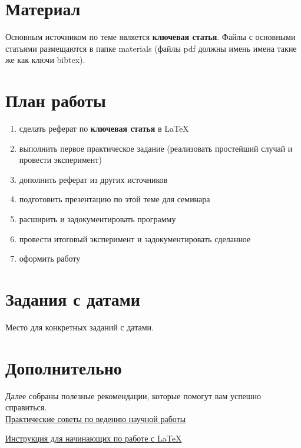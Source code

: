 \documentclass[a4paper,12pt]{article}
\begin{document}
\section{Материал}

Основным источником по теме является \textbf{ключевая статья}. Файлы с основными статьями размещаются в папке materials (файлы pdf должны имень имена такие же как ключи bibtex).


\section{План работы}

\begin{enumerate}
	\item сделать реферат по \textbf{ключевая статья} в LaTeX
	\item выполнить первое практическое задание (реализовать простейший случай и провести эксперимент)
	\item дополнить реферат из других источников
	\item подготовить презентацию по этой теме для семинара
	\item расширить и задокументировать программу
	\item провести итоговый эксперимент и задокументировать сделанное
	\item оформить работу
\end{enumerate}


\section{Задания с датами}

Место для конкретных заданий с датами.

\section{Дополнительно}

Далее собраны полезные рекомендации, которые помогут вам успешно справиться.\\

\href{http://compvis.isu.ru/wp-content/uploads/2015/11/PracticalScienceMethodology_1.pdf}{Практические советы по ведению научной работы}

\href{http://compvis.isu.ru/?p=389}{Инструкция для начинающих по работе с LaTeX}\\


\end{document}

